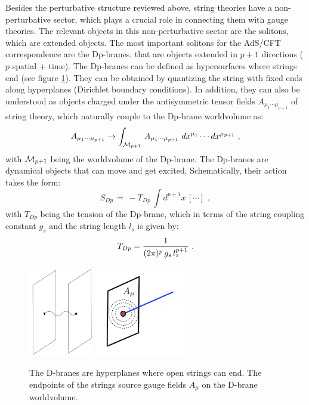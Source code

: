\documentclass[12pt,notitlepage]{article}
\newcommand{\beq}{\begin{equation}}
\newcommand{\eeq}{\end{equation}}
\begin{document}
Besides the perturbative structure reviewed above, string theories have  a non-perturbative sector, which plays a crucial role in connecting them with gauge theories. The  relevant objects  in this non-perturbative sector are the solitons, which  are extended objects. The most important solitons for the AdS/CFT correspondence   are the  Dp-branes, that are objects extended in $p+1$ directions  ($p$ spatial + time). The Dp-branes can be defined as hypersurfaces where strings end (see figure \ref{Dbranes}). They can be obtained by quantizing the string with fixed ends along hyperplanes (Dirichlet boundary conditions). In addition, they can also be understood as objects charged under the antisymmetric tensor fields $A_{\mu_1\cdots\mu_{p+1}}$ of string theory, which naturally couple to the Dp-brane worldvolume as:
\beq
A_{\mu_1\cdots\mu_{p+1}}\to
\int_{{\cal M}_{p+1}}\,A_{\mu_1\cdots\mu_{p+1}}\,\, dx^{\mu_1}\cdots  dx^{\mu_{p+1}}\,\,,
\eeq
with ${\cal M}_{p+1}$  being the worldvolume of the Dp-brane. The Dp-branes are dynamical objects
that can move and get excited. Schematically, their action takes the form:
\beq
S_{Dp}\,=\,-T_{Dp}\,\int d^{p+1} x\,[\cdots]\,\,,
\eeq
with $T_{Dp}$ being the tension of the Dp-brane, which in terms of the string coupling constant $g_s$ and the  string  length $l_s$ is given by:
\beq
T_{Dp}={1\over (2\pi)^p \,g_s \, l_s^{p+1}}\,\,.
\label{TDp}
\eeq
\begin{figure}[ht]
\center
\includegraphics[width=0.25\textwidth]{Dbranes.pdf}
\qquad\qquad\qquad
\includegraphics[width=0.35\textwidth]{gauge_source.pdf}
\caption{The D-branes are hyperplanes where open strings can end. The endpoints of the strings source gauge fields $A_{\mu}$ on the D-brane worldvolume.} 
\label{Dbranes}
\end{figure}
\end{document}
